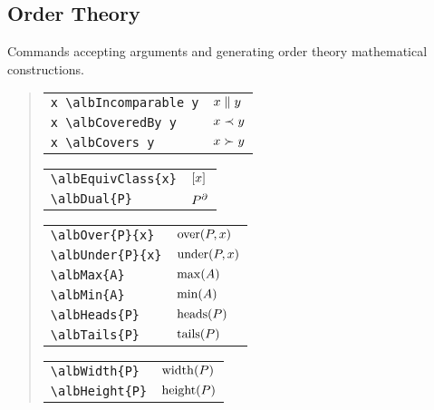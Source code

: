 \documentclass[11pt,a4paper,oneside]{alb-corp}
\begin{document}
\subsection{Order Theory}
\label{sec:alb-order-theory-documentation:order-theory}

Commands accepting arguments and generating order theory mathematical
constructions.

\begin{quote}
  \begin{tabular}{p{}@{\qquad}p{}}
    \verb$x \albIncomparable y$ & $x \parallel y$ \\
    \verb$x \albCoveredBy y$ & $x \prec y$ \\
    \verb$x \albCovers y$ & $x \succ y$
  \end{tabular}

  \begin{tabular}{p{}@{\qquad}p{}}
    \verb$\albEquivClass{x}$ & $\albEquivClass{x}$ \\
    \verb$\albDual{P}$ & $\albDual{P}$
  \end{tabular}

  \begin{tabular}{p{}@{\qquad}p{}}
    \verb$\albOver{P}{x}$ & $\operatorname{over}(P, x)$ \\
    \verb$\albUnder{P}{x}$ & $\operatorname{under}(P, x)$ \\
    \verb$\albMax{A}$ & $\operatorname{max}(A)$ \\
    \verb$\albMin{A}$ & $\operatorname{min}(A)$ \\
    \verb$\albHeads{P}$ & $\operatorname{heads}(P)$ \\
    \verb$\albTails{P}$ & $\operatorname{tails}(P)$
  \end{tabular}

  \begin{tabular}{p{}@{\qquad}p{}}
    \verb$\albWidth{P}$ & $\operatorname{width}(P)$ \\
    \verb$\albHeight{P}$ & $\operatorname{height}(P)$
  \end{tabular}


\end{quote}
\end{document}
